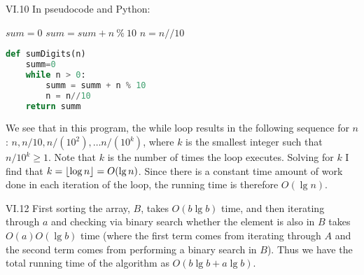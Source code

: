 \begin{problem}{VI.10} In pseudocode and Python:


\begin{algorithmic}[0]
\State $sum = 0$ 
\State $sum = sum + n~\%~10$
\State $n= n//10$
\EndWhile
{}
  \EndFunction
  \end{algorithmic}
  
  \begin{lstlisting}[language=Python]
def sumDigits(n)
	summ=0
	while n > 0:
		summ = summ + n % 10
		n = n//10
	return summ
\end{lstlisting}

We see that in this program, the while loop results in the following sequence for $n$: $n, n/10, n/(10^2), \ldots n/(10^k)$, where $k$ is the smallest integer such that $n/10^k \ge 1$.  Note that $k$ is the number of times the loop executes.  Solving for $k$ I find that $k = \lfloor\log{n}\rfloor = O(\lg n)$.  Since there is a constant time amount of work done in each iteration of the loop, the running time is therefore $O(\lg n)$.
  
  \end{problem}
  
  \begin{problem}{VI.12} First sorting the array, $B$, takes $O(b\lg b)$ time, and then iterating through $a$ and checking via binary search whether the element is also in $B$ takes $O(a)O(\lg b)$ time (where the first term comes from iterating through $A$ and the second term comes from performing a binary search in $B$).  Thus we have the total running time of the algorithm as $O(b\lg b + a \lg b)$.
  
    \end{problem}

